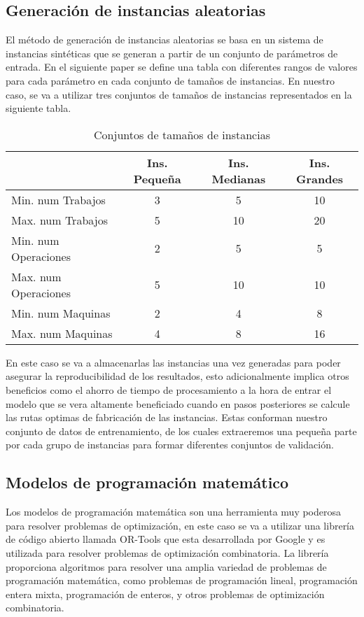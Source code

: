 \subsection{Generación de instancias aleatorias}
El método de generación de instancias aleatorias se basa en un sistema de instancias sintéticas
que se generan a partir de un conjunto de parámetros de entrada. En el siguiente paper \cite{pbrandimarte}
se define una tabla con diferentes rangos de valores para cada parámetro en cada conjunto de
tamaños de instancias. En nuestro caso, se va a utilizar tres conjuntos de tamaños de instancias
representados en la siguiente tabla.

\begin{table}[ht]
    \centering
    \begin{tabular}[t]{|l|ccc|}
        \hline
                  & Ins. Pequeña & Ins. Medianas & Ins. Grandes \\
        \hline
        Min. num Trabajos    & 3    & 5     & 10    \\
        Max. num Trabajos    & 5    & 10    & 20    \\
        Min. num Operaciones & 2    & 5     & 5     \\
        Max. num Operaciones & 5    & 10    & 10    \\
        Min. num Maquinas    & 2    & 4     & 8     \\
        Max. num Maquinas    & 4    & 8     & 16    \\
        \hline
    \end{tabular}
    \caption{Conjuntos de tamaños de instancias}
\end{table}

En este caso se va a almacenarlas las instancias una vez generadas para poder asegurar la reproducibilidad 
de los resultados, esto adicionalmente implica otros beneficios como el ahorro de tiempo de procesamiento
a la hora de entrar el modelo que se vera altamente beneficiado cuando en pasos posteriores se calcule
las rutas optimas de fabricación de las instancias. Estas conforman nuestro conjunto de datos de 
entrenamiento, de los cuales extraeremos una pequeña parte por cada grupo de instancias para formar
diferentes conjuntos de validación. 

\subsection{Modelos de programación matemático}
Los modelos de programación matemática son una herramienta muy poderosa para resolver problemas
de optimización, en este caso se va a utilizar una librería de código abierto llamada OR-Tools 
\cite{ortools} que esta desarrollada por Google y es utilizada para resolver problemas de optimización 
combinatoria. La librería proporciona algoritmos para resolver una amplia variedad de problemas 
de programación matemática, como problemas de programación lineal, programación entera mixta, 
programación de enteros, y otros problemas de optimización combinatoria.\medskip 

